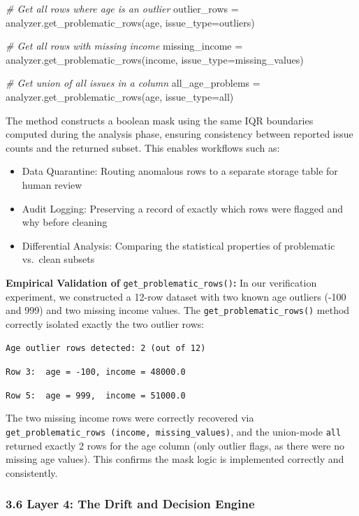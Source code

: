 \documentclass{article}
\begin{document}
\emph{\# Get all rows where age is an outlier} outlier\_rows =
analyzer.get\_problematic\_rows(age, issue\_type=outliers)

\emph{\# Get all rows with missing income} missing\_income =
analyzer.get\_problematic\_rows(income, issue\_type=missing\_values)

\emph{\# Get union of all issues in a column} all\_age\_problems =
analyzer.get\_problematic\_rows(age, issue\_type=all)

The method constructs a boolean mask using the same IQR boundaries
computed during the analysis phase, ensuring consistency between
reported issue counts and the returned subset. This enables workflows
such as:

\begin{itemize}
\item
  Data Quarantine: Routing anomalous rows to a separate storage table
  for human review
\item
  Audit Logging: Preserving a record of exactly which rows were flagged
  and why before cleaning
\item
  Differential Analysis: Comparing the statistical properties of
  problematic vs.~clean subsets
\end{itemize}

\textbf{Empirical Validation of}
\texttt{get\_problematic\_rows()}\textbf{:} In our verification
experiment, we constructed a 12-row dataset with two known age outliers
(-100 and 999) and two missing income values. The
\texttt{get\_problematic\_rows()} method correctly isolated exactly the
two outlier rows:

\texttt{Age\ outlier\ rows\ detected:\ 2\ (out\ of\ 12)}

\texttt{Row\ 3:\ \ age\ =\ -100,\ }\texttt{income\ =\ 48000.0}

\texttt{Row\ 5:\ \ age\ =\ 999,}\texttt{\ }\texttt{\ income\ =\ 51000.0}

The two missing income rows were correctly recovered via
\texttt{get\_problematic\_}\texttt{rows\ (}\texttt{income,~missing\_values)},
and the union-mode \texttt{all} returned exactly 2 rows for the age
column (only outlier flags, as there were no missing age values). This
confirms the mask logic is implemented correctly and consistently.

\subsubsection{3.6 Layer 4: The Drift and Decision
Engine}\label{layer-4-the-drift-and-decision-engine}
\end{document}
